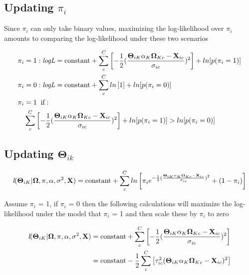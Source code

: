 \documentclass[12pt]{article}
\begin{document}
\subsection*{Updating $\pi_{i}$}

Since $\pi_{i}$ can only take binary values, maximizing the log-likelihood over $\pi_{i}$ amounts to comparing the log-likelihood under these two scenarios

\begin{align}
\pi_{i} &= 1: \textit{logL} = \text{constant} + \sum_{c}^{C}\left[{-\frac{1}{2}(\frac{\mathbf{\Theta}_{iK}\alpha_{K}\mathbf{\Omega}_{Kc} - \textbf{X}_{ic}}{\sigma_{ic}})^2}\right] + ln[p(\pi_{i} = 1)]\notag\\
\pi_{i} &= 0: \textit{logL} = \text{constant} + \sum_{c}^{C}ln\left[1\right] + ln[p(\pi_{i} = 0)]\notag\\
\pi_{i} &= 1 \hspace{2mm}\text{if}:\notag\\ & \sum_{c}^{C}\left[{-\frac{1}{2}(\frac{\mathbf{\Theta}_{iK}\alpha_{K}\mathbf{\Omega}_{Kc} - \textbf{X}_{ic}}{\sigma_{ic}})^2}\right] + ln[p(\pi_{i} = 1)] > ln[p(\pi_{i} = 0)]
\end{align}

\subsection*{Updating $\mathbf{\Theta}_{ik}$}

\begin{align}
\textit{l}(\mathbf{\Theta}_{iK} | \mathbf{\Omega}, \pi, \alpha, \sigma^{2}, \textbf{X}) &= \text{constant} + \sum_{c}^{C}ln\left[\pi_{i}e^{-\frac{1}{2}(\frac{\mathbf{\Theta}_{iK}\alpha_{K}\mathbf{\Omega}_{Kc} - \textbf{X}_{ic}}{\sigma_{ic}})^2} + (1-\pi_{i})\right]\notag\\
\end{align}

Assume $\pi_{i}$ = 1, if $\pi_{i}$ = 0 then the following calculations will maximize the log-likelihood under the model that $\pi_{i}$ = 1 and then scale these by $\pi_{i}$ to zero

\begin{align}
\textit{l}(\mathbf{\Theta}_{iK} | \mathbf{\Omega}, \pi, \alpha, \sigma^{2}, \textbf{X}) &= \text{constant} + \sum_{c}^{C}\left[{-\frac{1}{2}(\frac{\mathbf{\Theta}_{iK}\alpha_{K}\mathbf{\Omega}_{Kc} - \textbf{X}_{ic}}{\sigma_{ic}})^2}\right]\notag\\
 &= \text{constant} -\frac{1}{2}\sum_{c}^{C}\left[{\tau_{ic}^{2}(\mathbf{\Theta}_{iK}\alpha_{K}\mathbf{\Omega}_{Kc} - \textbf{X}_{ic})^2}\right]\notag\\
\end{align}
\end{document}
